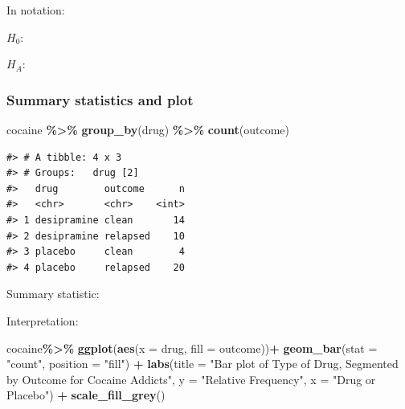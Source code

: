 \documentclass[
]{report}
\newenvironment{Shaded}{\begin{snugshade}}{\end{snugshade}}
\newcommand{\AttributeTok}[1]{\textcolor[rgb]{0.13,0.29,0.53}{#1}}
\newcommand{\FunctionTok}[1]{\textcolor[rgb]{0.13,0.29,0.53}{\textbf{#1}}}
\newcommand{\NormalTok}[1]{#1}
\newcommand{\SpecialCharTok}[1]{\textcolor[rgb]{0.81,0.36,0.00}{\textbf{#1}}}
\newcommand{\StringTok}[1]{\textcolor[rgb]{0.31,0.60,0.02}{#1}}
\begin{document}
In notation:

\(H_0:\)

\vspace{0.2in}

\(H_A:\)

\vspace{0.2in}

\subsubsection*{Summary statistics and plot}\label{summary-statistics-and-plot}

\begin{Shaded}
\begin{Highlighting}[]
\NormalTok{cocaine }\SpecialCharTok{\%\textgreater{}\%} \FunctionTok{group\_by}\NormalTok{(drug) }\SpecialCharTok{\%\textgreater{}\%} \FunctionTok{count}\NormalTok{(outcome)}
\end{Highlighting}
\end{Shaded}

\begin{verbatim}
#> # A tibble: 4 x 3
#> # Groups:   drug [2]
#>   drug        outcome      n
#>   <chr>       <chr>    <int>
#> 1 desipramine clean       14
#> 2 desipramine relapsed    10
#> 3 placebo     clean        4
#> 4 placebo     relapsed    20
\end{verbatim}

Summary statistic:

\vspace{0.3in}

Interpretation:

\vspace{0.4in}

\begin{Shaded}
\begin{Highlighting}[]
\NormalTok{cocaine}\SpecialCharTok{\%\textgreater{}\%}
  \FunctionTok{ggplot}\NormalTok{(}\FunctionTok{aes}\NormalTok{(}\AttributeTok{x =}\NormalTok{ drug, }\AttributeTok{fill =}\NormalTok{ outcome))}\SpecialCharTok{+}
  \FunctionTok{geom\_bar}\NormalTok{(}\AttributeTok{stat =} \StringTok{"count"}\NormalTok{, }\AttributeTok{position =} \StringTok{"fill"}\NormalTok{) }\SpecialCharTok{+}
  \FunctionTok{labs}\NormalTok{(}\AttributeTok{title =} \StringTok{"Bar plot of Type of Drug, Segmented by }
\StringTok{       Outcome for Cocaine Addicts"}\NormalTok{,}
       \AttributeTok{y =} \StringTok{"Relative Frequency"}\NormalTok{,}
       \AttributeTok{x =} \StringTok{"Drug or Placebo"}\NormalTok{) }\SpecialCharTok{+}
    \FunctionTok{scale\_fill\_grey}\NormalTok{()}
\end{Highlighting}
\end{Shaded}
\end{document}
